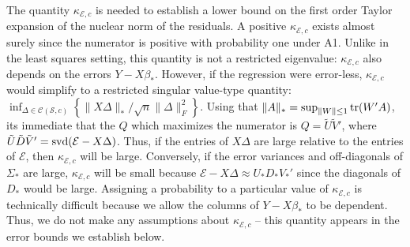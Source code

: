 \documentclass[12pt]{article}
\begin{document}
The quantity $\kappa_{\mathcal{E},c}$ is needed to establish a lower bound on the first order Taylor expansion of the nuclear norm of the residuals. A positive $\kappa_{\mathcal{E},c}$ exists almost surely since the numerator is positive with probability one under A1. Unlike in the least squares setting, this quantity is not a restricted eigenvalue: $\kappa_{\mathcal{E},c}$ also depends on the errors $Y - X\beta_*$. However, if the regression were error-less, $\kappa_{\mathcal{E},c}$ would simplify to a restricted singular value-type quantity: $\inf_{\Delta \in\mathcal{C}(\mathcal{S}, c)} \left\{ \|X\Delta\|_*/ \sqrt{n}\|\Delta\|_F^2\right\}$. Using that $\|A\|_* = \sup_{\|W\| \leq 1} {\rm tr}(W'A)$, its immediate that the $Q$ which maximizes the numerator is $Q = \tilde{U}\tilde{V}'$, where $\tilde{U}\tilde{D}\tilde{V}' = {\rm svd}(\mathcal{E} - X\Delta)$. Thus, if the entries of $X\Delta$ are large relative to the entries of $\mathcal{E}$, then $\kappa_{\mathcal{E},c}$ will be large. Conversely, if the error variances and off-diagonals of $\Sigma_*$ are large, $\kappa_{\mathcal{E},c}$ will be small because $\mathcal{E} - X\Delta \approx U_*D_*V_*'$ since the diagonals of $D_*$ would be large. Assigning a probability to a particular value of $\kappa_{\mathcal{E},c}$ is technically difficult because we allow the columns of $Y - X\beta_*$ to be dependent. Thus, we do not make any assumptions about $\kappa_{\mathcal{E},c}$ -- this quantity appears in the error bounds we establish below. 


\end{document}

